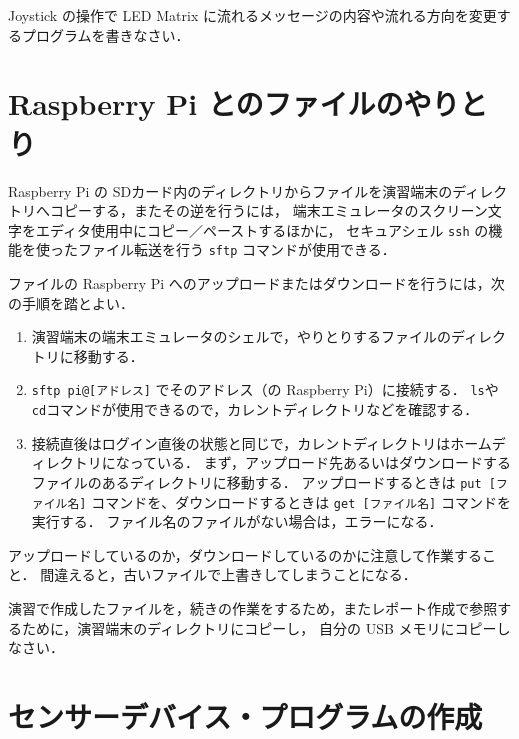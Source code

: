 \documentclass[11pt,a4,epsf]{report}
\begin{document}
\begin{excercise}
Joystick の操作で LED Matrix に流れるメッセージの内容や流れる方向を変更するプログラムを書きなさい．
\end{excercise}


\section{Raspberry Pi とのファイルのやりとり}

Raspberry Pi の SDカード内のディレクトリからファイルを演習端末のディレクトリへコピーする，またその逆を行うには，
端末エミュレータのスクリーン文字をエディタ使用中にコピー／ペーストするほかに，
セキュアシェル \verb+ssh+ の機能を使ったファイル転送を行う \verb+sftp+ コマンドが使用できる．

ファイルの Raspberry Pi へのアップロードまたはダウンロードを行うには，次の手順を踏とよい．
\begin{enumerate}
\item
演習端末の端末エミュレータのシェルで，やりとりするファイルのディレクトリに移動する．
\item
\verb+sftp pi@[アドレス]+ でそのアドレス（の Raspberry Pi）に接続する．
\verb+ls+や\verb+cd+コマンドが使用できるので，カレントディレクトリなどを確認する．
\item
接続直後はログイン直後の状態と同じで，カレントディレクトリはホームディレクトリになっている．
まず，アップロード先あるいはダウンロードするファイルのあるディレクトリに移動する．
アップロードするときは \verb+put [ファイル名]+ コマンドを、ダウンロードするときは \verb+get [ファイル名]+ コマンドを実行する．
ファイル名のファイルがない場合は，エラーになる．
\end{enumerate}
アップロードしているのか，ダウンロードしているのかに注意して作業すること．
間違えると，古いファイルで上書きしてしまうことになる．

\begin{excercise}
演習で作成したファイルを，続きの作業をするため，またレポート作成で参照するために，演習端末のディレクトリにコピーし，
自分の USB メモリにコピーしなさい．
\end{excercise}

\section{センサーデバイス・プログラムの作成}
\end{document}

